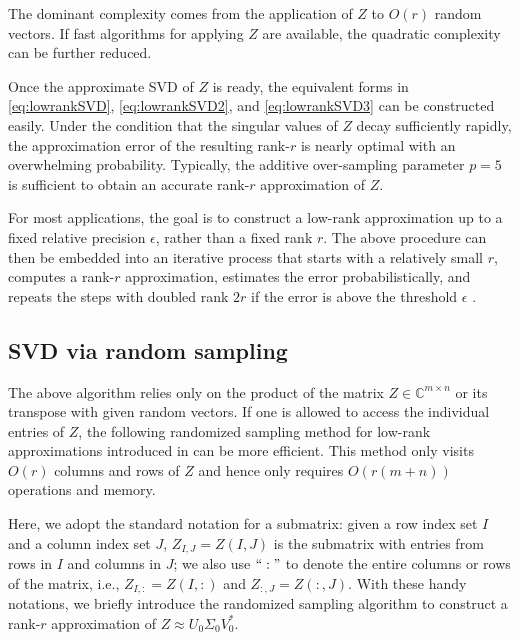 The dominant complexity comes from the application of $Z$ to $O(r)$ random vectors. If fast algorithms for applying $Z$ are available, the quadratic complexity can be further reduced.

Once the approximate {SVD} of $Z$ is ready, the equivalent forms in
\eqref{eq:lowrankSVD}, \eqref{eq:lowrankSVD2}, and
\eqref{eq:lowrankSVD3} can be constructed easily. Under the condition that the singular values of $Z$ decay sufficiently rapidly, the approximation error of the resulting rank-$r$ is nearly optimal with an overwhelming probability. Typically, the additive over-sampling parameter $p=5$ is sufficient to obtain an accurate rank-$r$ approximation of $Z$.

For most applications, the goal is to construct a low-rank approximation up to a fixed relative precision $\epsilon$, rather than a fixed rank $r$. The above procedure can then be embedded into an iterative process that starts with a relatively small $r$, computes a rank-$r$ approximation, estimates the error probabilistically, and repeats the steps with doubled rank $2r$ if the error is above the threshold $\epsilon$ \cite{Rec1}.

\subsection{SVD via random sampling}
\label{sec:RandSampling}
The above algorithm relies only on the product of the matrix $Z\in
\mathbb{C}^{m\times n}$ or its transpose with given random vectors.  If one is allowed to access the individual entries of $Z$, the following randomized sampling method for low-rank approximations introduced in \cite{Butterfly4,symbol3} can be more efficient. This method only visits $O(r)$ columns and rows of $Z$ and hence only requires $O(r(m+n))$ operations and memory.

Here, we adopt the standard notation for a submatrix: given a row index set $I$ and a column index set $J$, $Z_{I,J}=Z(I,J)$ is the submatrix with entries from rows in $I$ and columns in $J$; we also use $``:"$ to denote the entire columns or rows of the matrix, i.e., $Z_{I,:} = Z(I,:)$ and $Z_{:,J} = Z(:,J)$.  With these handy notations, we briefly introduce the randomized sampling algorithm to construct a rank-$r$ approximation of $Z\approx U_0\Sigma_0V_0^*$.

